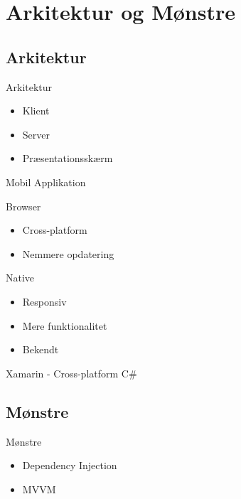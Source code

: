\section{Arkitektur og Mønstre}

\subsection{Arkitektur}
\begin{frame}{Arkitektur}
	\begin{itemize}
		\item Klient
		\item Server
		\item Præsentationsskærm
	\end{itemize}
\end{frame}


\begin{frame}{Mobil Applikation}
\begin{multicols}{2}
Browser
\begin{itemize}
	\item Cross-platform
	\item Nemmere opdatering
\end{itemize}
\columnbreak
Native
\begin{itemize}
	\item Responsiv
	\item Mere funktionalitet
	\item Bekendt
\end{itemize}
\end{multicols}
Xamarin - Cross-platform C\#
\end{frame}

\subsection{Mønstre}
\begin{frame}{Mønstre}
	\begin{itemize}
		\item Dependency Injection
		\item MVVM
	\end{itemize}
\end{frame}